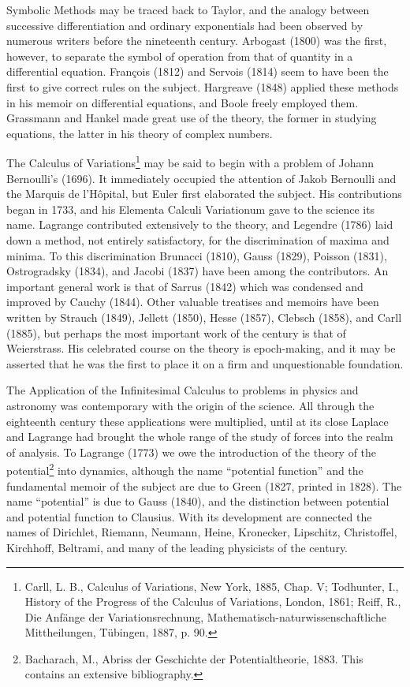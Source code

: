\documentclass[oneside]{book}
\begin{document}
Symbolic Methods may be traced back to Taylor, and the analogy
between successive differentiation and ordinary exponentials had
been observed by numerous writers before the nineteenth
century. Arbogast (1800) was the first, however, to separate the
symbol of operation from that of quantity in a differential
equation. Fran\c{c}ois (1812) and Servois (1814) seem to have been
the first to give correct rules on the subject. Hargreave (1848)
applied these methods in his memoir on differential equations, and
Boole freely employed them. Grassmann and Hankel made great use of
the theory, the former in studying equations, the latter in his
theory of complex numbers.

The Calculus of Variations\footnote{Carll, L. B., Calculus of
Variations, New York, 1885, Chap. V; Todhunter, I., History of the
Progress of the Calculus of Variations, London, 1861; Reiff, R., Die
Anf\"ange der Variationsrechnung,
Mathematisch-naturwissenschaftliche Mittheilungen, T\"ubingen,
1887, p. 90.} may be said to begin with a problem of Johann
Bernoulli's (1696). It immediately occupied the attention of Jakob
Bernoulli and the Marquis de l'H\^opital, but Euler first elaborated
the subject. His contributions began in 1733, and his Elementa
Calculi Variationum gave to the science its name. Lagrange
contributed extensively to the theory, and Legendre (1786) laid down
a method, not entirely satisfactory, for the discrimination of
maxima and minima. To this discrimination Brunacci (1810), Gauss
(1829), Poisson (1831), Ostrogradsky (1834), and Jacobi (1837) have
been among the contributors. An important general work is that of
Sarrus (1842) which was condensed and improved by Cauchy
(1844). Other valuable treatises and memoirs have been written by
Strauch (1849), Jellett (1850), Hesse (1857), Clebsch (1858), and
Carll (1885), but perhaps the most important work of the century is
that of Weierstrass. His celebrated course on the theory is
epoch-making, and it may be asserted that he was the first to place
it on a firm and unquestionable foundation.

The Application of the Infinitesimal Calculus to problems in physics
and astronomy was contemporary with the origin of the science. All
through the eighteenth century these applications were multiplied,
until at its close Laplace and Lagrange had brought the whole range
of the study of forces into the realm of analysis. To Lagrange
(1773) we owe the introduction of the theory of the
potential\footnote{Bacharach, M., Abriss der Geschichte der
Potentialtheorie, 1883. This contains an extensive bibliography.}
into dynamics, although the name ``potential function'' and the
fundamental memoir of the subject are due to Green (1827, printed in
1828). The name ``potential'' is due to Gauss (1840), and the
distinction between potential and potential function to
Clausius. With its development are connected the names of Dirichlet,
Riemann, Neumann, Heine, Kronecker, Lipschitz, Christoffel,
Kirchhoff, Beltrami, and many of the leading physicists of the
century.
\end{document}
